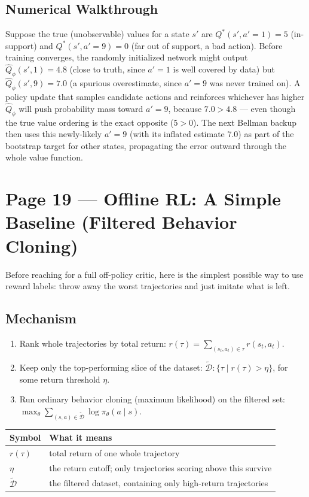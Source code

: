 \documentclass[11pt]{article}
\begin{document}
\subsection*{Numerical Walkthrough}

Suppose the true (unobservable) values for a state $s'$ are $Q^*(s',a'=1)=5$ (in-support) and $Q^*(s',a'=9)=0$ (far out of support, a bad action). Before training converges, the randomly initialized network might output $\hat Q_\phi(s',1)=4.8$ (close to truth, since $a'=1$ is well covered by data) but $\hat Q_\phi(s',9)=7.0$ (a spurious overestimate, since $a'=9$ was never trained on). A policy update that samples candidate actions and reinforces whichever has higher $\hat Q_\phi$ will push probability mass toward $a'=9$, because $7.0 > 4.8$ --- even though the true value ordering is the exact opposite ($5 > 0$). The next Bellman backup then uses this newly-likely $a'=9$ (with its inflated estimate $7.0$) as part of the bootstrap target for other states, propagating the error outward through the whole value function.

\section*{Page 19 --- Offline RL: A Simple Baseline (Filtered Behavior Cloning)}

Before reaching for a full off-policy critic, here is the simplest possible way to use reward labels: throw away the worst trajectories and just imitate what is left.

\subsection*{Mechanism}

\begin{enumerate}
\item Rank whole trajectories by total return: $r(\tau) = \sum_{(s_t,a_t)\in\tau} r(s_t,a_t)$.
\item Keep only the top-performing slice of the dataset: $\widetilde{\mathcal{D}} : \{\tau \mid r(\tau) > \eta\}$, for some return threshold $\eta$.
\item Run ordinary behavior cloning (maximum likelihood) on the filtered set: $\max_\theta \sum_{(s,a)\in\widetilde{\mathcal{D}}} \log \pi_\theta(a\mid s)$.
\end{enumerate}

\begin{center}
\begin{tabular}{@{}ll@{}}
\toprule
Symbol & What it means \\
\midrule
$r(\tau)$ & total return of one whole trajectory \\
$\eta$ & the return cutoff; only trajectories scoring above this survive \\
$\widetilde{\mathcal{D}}$ & the filtered dataset, containing only high-return trajectories \\
\bottomrule
\end{tabular}
\end{center}
\end{document}
